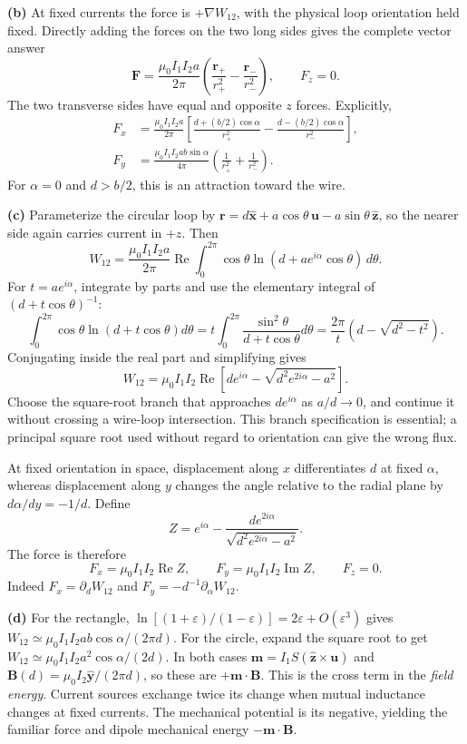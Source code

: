 \textbf{(b)} At fixed currents the force is $+\nabla W_{12}$, with
the physical loop orientation held fixed. Directly adding the forces on
the two long sides gives the complete vector answer
\[
\boxed{\mathbf F=\frac{\mu_0I_1I_2a}{2\pi}
\left(\frac{\mathbf r_+}{r_+^2}-\frac{\mathbf r_-}{r_-^2}\right),\qquad F_z=0.}
\]
The two transverse sides have equal and opposite $z$ forces.
Explicitly,
\[
\begin{aligned}
F_x&=\frac{\mu_0I_1I_2a}{2\pi}
\left[\frac{d+(b/2)\cos\alpha}{r_+^2}
-\frac{d-(b/2)\cos\alpha}{r_-^2}\right],\\
F_y&=\frac{\mu_0I_1I_2ab\sin\alpha}{4\pi}
\left(\frac1{r_+^2}+\frac1{r_-^2}\right).
\end{aligned}
\]
For $\alpha=0$ and $d>b/2$, this is an attraction toward the wire.

\textbf{(c)} Parameterize the circular loop by
$\mathbf r=d\widehat{\mathbf x}+a\cos\theta\,\mathbf u
-a\sin\theta\,\widehat{\mathbf z}$, so the nearer side again carries
current in $+z$. Then
\[
W_{12}=\frac{\mu_0I_1I_2a}{2\pi}
\operatorname{Re}\int_0^{2\pi}
\cos\theta\ln(d+ae^{i\alpha}\cos\theta)\,d\theta.
\]
For $t=ae^{i\alpha}$, integrate by parts and use the elementary
integral of $(d+t\cos\theta)^{-1}$:
\[
\int_0^{2\pi}\cos\theta\ln(d+t\cos\theta)d\theta
=t\int_0^{2\pi}\frac{\sin^2\theta}{d+t\cos\theta}d\theta
=\frac{2\pi}{t}\left(d-\sqrt{d^2-t^2}\right).
\]
Conjugating inside the real part and simplifying gives
\[
\boxed{W_{12}=\mu_0I_1I_2\operatorname{Re}
\left[de^{i\alpha}-\sqrt{d^2e^{2i\alpha}-a^2}\right].}
\]
Choose the square-root branch that approaches $de^{i\alpha}$ as
$a/d\to0$, and continue it without crossing a wire-loop intersection.
This branch specification is essential; a principal square root used
without regard to orientation can give the wrong flux.

At fixed orientation in space, displacement along $x$ differentiates
$d$ at fixed $\alpha$, whereas displacement along $y$ changes the
angle relative to the radial plane by $d\alpha/dy=-1/d$.
Define
\[
Z=e^{i\alpha}-\frac{de^{2i\alpha}}{\sqrt{d^2e^{2i\alpha}-a^2}}.
\]
The force is therefore
\[
\boxed{F_x=\mu_0I_1I_2\operatorname{Re}Z,\qquad
F_y=\mu_0I_1I_2\operatorname{Im}Z,\qquad F_z=0.}
\]
Indeed $F_x=\partial_dW_{12}$ and
$F_y=-d^{-1}\partial_\alpha W_{12}$.

\textbf{(d)} For the rectangle,
$\ln[(1+\varepsilon)/(1-\varepsilon)]=2\varepsilon+O(\varepsilon^3)$
gives $W_{12}\simeq\mu_0I_1I_2ab\cos\alpha/(2\pi d)$.
For the circle, expand the square root to get
$W_{12}\simeq\mu_0I_1I_2a^2\cos\alpha/(2d)$.
In both cases $\mathbf m=I_1S(\widehat{\mathbf z}\times\mathbf u)$
and $\mathbf B(d)=\mu_0I_2\widehat{\mathbf y}/(2\pi d)$, so these are
$+\mathbf m\cdot\mathbf B$.
This is the cross term in the \emph{field energy}. Current sources
exchange twice its change when mutual inductance changes at fixed
currents. The mechanical potential is its negative, yielding the
familiar force and dipole mechanical energy $-\mathbf m\cdot\mathbf B$.


